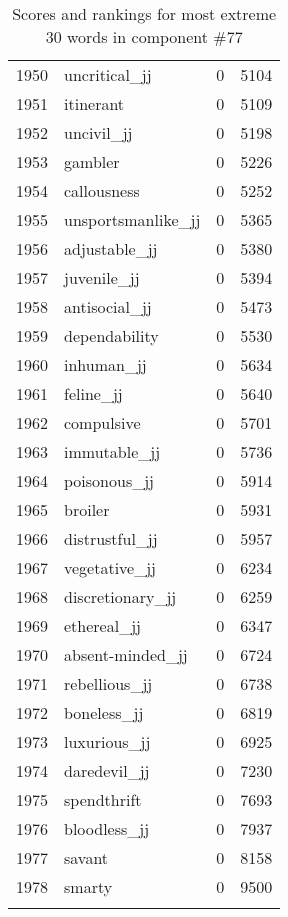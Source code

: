\begin{longtable}[!htbp]{| rlr@{.}l |}
    1950 & uncritical\_jj & 0 & 5104 \\
    1951 & itinerant & 0 & 5109 \\
    1952 & uncivil\_jj & 0 & 5198 \\
    1953 & gambler & 0 & 5226 \\
    1954 & callousness & 0 & 5252 \\
    1955 & unsportsmanlike\_jj & 0 & 5365 \\
    1956 & adjustable\_jj & 0 & 5380 \\
    1957 & juvenile\_jj & 0 & 5394 \\
    1958 & antisocial\_jj & 0 & 5473 \\
    1959 & dependability & 0 & 5530 \\
    1960 & inhuman\_jj & 0 & 5634 \\
    1961 & feline\_jj & 0 & 5640 \\
    1962 & compulsive & 0 & 5701 \\
    1963 & immutable\_jj & 0 & 5736 \\
    1964 & poisonous\_jj & 0 & 5914 \\
    1965 & broiler & 0 & 5931 \\
    1966 & distrustful\_jj & 0 & 5957 \\
    1967 & vegetative\_jj & 0 & 6234 \\
    1968 & discretionary\_jj & 0 & 6259 \\
    1969 & ethereal\_jj & 0 & 6347 \\
    1970 & absent-minded\_jj & 0 & 6724 \\
    1971 & rebellious\_jj & 0 & 6738 \\
    1972 & boneless\_jj & 0 & 6819 \\
    1973 & luxurious\_jj & 0 & 6925 \\
    1974 & daredevil\_jj & 0 & 7230 \\
    1975 & spendthrift & 0 & 7693 \\
    1976 & bloodless\_jj & 0 & 7937 \\
    1977 & savant & 0 & 8158 \\
    1978 & smarty & 0 & 9500 \\
    \hline
    \caption{Scores and rankings for most extreme 30 words in component \#77} \\
\end{longtable}
